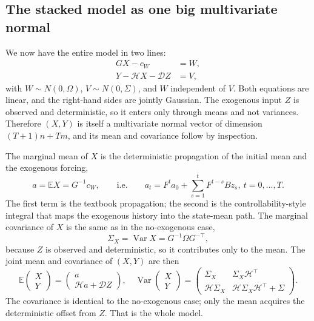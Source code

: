 \documentclass[11pt]{article}
\newcommand{\E}{\mathbb E}
\newcommand{\Var}{\operatorname{Var}}
\begin{document}
\subsection{The stacked model as one big multivariate normal}
\label{sec:mvn}

We now have the entire model in two lines:
\begin{align}
GX-c_W &= W,\\
Y - \mathcal HX - \mathcal D Z &= V,
\end{align}
with $W\sim N(0,\Omega)$, $V\sim N(0,\Sigma)$, and $W$ independent of $V$.
Both equations are linear, and the right-hand sides are jointly Gaussian.
The exogenous input $Z$ is observed and deterministic, so it enters only
through means and not variances.  Therefore $(X,Y)$ is itself a
multivariate normal vector of dimension $(T+1)n+Tm$, and its mean and
covariance follow by inspection.

The marginal mean of $X$ is the deterministic propagation of the initial
mean and the exogenous forcing,
\begin{equation}
a=\E X=G^{-1}c_W,
\qquad\text{i.e.}\qquad a_t=F^t a_0+\sum_{s=1}^{t} F^{t-s} B z_s,\ t=0,\ldots,T.
\end{equation}
The first term is the textbook propagation; the second is the
controllability-style integral that maps the exogenous history into the
state-mean path.  The marginal covariance of $X$ is the same as in the
no-exogenous case,
\begin{equation}
\Sigma_X=\Var X=G^{-1}\Omega G^{-\top},
\end{equation}
because $Z$ is observed and deterministic, so it contributes only to
the mean.
The joint mean and covariance of $(X,Y)$ are then
\begin{equation}
\E\begin{pmatrix}X\\Y\end{pmatrix}=\begin{pmatrix}a\\ \mathcal H a+\mathcal D Z\end{pmatrix},
\quad
\Var\begin{pmatrix}X\\Y\end{pmatrix}=
\begin{pmatrix}\Sigma_X & \Sigma_X\mathcal H^\top\\
\mathcal H\Sigma_X & \mathcal H\Sigma_X\mathcal H^\top+\Sigma\end{pmatrix}.
\label{eq:joint}
\end{equation}
The covariance is identical to the no-exogenous case; only the mean
acquires the deterministic offset from $Z$.  That is the whole model.
\end{document}
